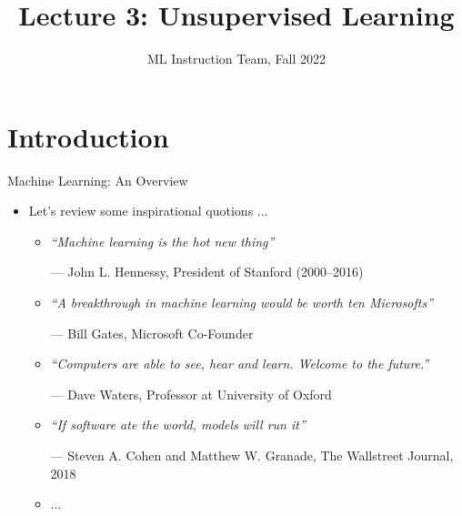 \documentclass[compress,oilve]{beamer}
\title{Lecture 3: Unsupervised Learning}
\author{ML Instruction Team, Fall 2022}
\institute[]{CE Department \newline  Sharif University of Technology \newline \newline}
\date[\today]{}
\begin{document}
	
	\fontsize{9}{9}
\begin{frame}
	\titlepage
\end{frame}

\section{Introduction}

\begin{frame}{Machine Learning: An Overview}
\begin{itemize}
\item Let's review some inspirational quotions ... \\
\begin{itemize}
	\item \textit{“Machine learning is the hot new thing”} \\ \begin{center}
— John L. Hennessy, President of Stanford (2000–2016) \end{center}
	\item\textit{ “A breakthrough in machine learning would be worth ten Microsofts” }\\ \begin{center}
— Bill Gates, Microsoft Co-Founder  \end{center}
	\item \textit{“Computers are able to see, hear and learn.  Welcome to the future.” }\\ \begin{center}
— Dave Waters, Professor at University of Oxford \end{center}
	\item \textit{“If software ate the world, models will run it”}
\\ \begin{center}
— Steven A. Cohen and Matthew W. Granade, The Wallstreet Journal, 2018\end{center}
	\item ...
\end{itemize}	
\end{itemize}
\end{frame}
\end{document}
